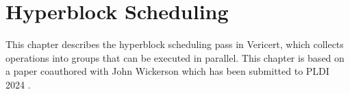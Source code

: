 \graphicspath{{./figures/5-hyperblock-scheduling/}}

\chapter{Hyperblock Scheduling}%
\label{sec:hyperblock-scheduling}

\begin{chapsummary}
  This chapter describes the hyperblock scheduling pass in Vericert, which
  collects operations into groups that can be executed in parallel.  This
  chapter is based on a paper coauthored with John Wickerson which has been
  submitted to PLDI 2024 \cite[]{herklotz24_hsvhls}.
\end{chapsummary}




